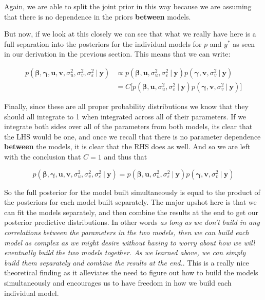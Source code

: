 \documentclass[12pt,twoside]{reedthesis}
\begin{document}
Again, we are able to split the joint prior in this way because we are assuming that there is no dependence in the priors \textbf{between} models.

But now, if we look at this closely we can see that what we really have here is a full separation into the posteriors for the individual models for \(p\) and \(y^*\) as seen in our derivation in the previous section. This means that we can write:

\[
\begin{aligned}
p(\boldsymbol{\beta}, \boldsymbol{\gamma}, \mathbf{u}, \mathbf{v}, \sigma_u^2, \sigma_v^2, \sigma_{\varepsilon}^2\ | \ \mathbf{y})  &\propto p(\boldsymbol{\beta}, \mathbf{u}, \sigma_u^2, \sigma_{\varepsilon}^2 \ | \ \mathbf{y})p(\boldsymbol{\gamma}, \mathbf{v}, \sigma_v^2 \ | \ \mathbf{y}) \\
  &= C\bigg[p(\boldsymbol{\beta}, \mathbf{u}, \sigma_u^2, \sigma_{\varepsilon}^2 \ | \ \mathbf{y})p(\boldsymbol{\gamma}, \mathbf{v}, \sigma_v^2 \ | \ \mathbf{y})\bigg]
\end{aligned}
\]

Finally, since these are all proper probability distributions we know that they should all integrate to 1 when integrated across all of their parameters. If we integrate both sides over all of the parameters from both models, its clear that the LHS would be one, and once we recall that there is no parameter dependence \textbf{between} the models, it is clear that the RHS does as well. And so we are left with the conclusion that \(C = 1\) and thus that

\[
p(\boldsymbol{\beta}, \boldsymbol{\gamma}, \mathbf{u}, \mathbf{v}, \sigma_u^2, \sigma_v^2, \sigma_{\varepsilon}^2\ | \ \mathbf{y})  = p(\boldsymbol{\beta}, \mathbf{u}, \sigma_u^2, \sigma_{\varepsilon}^2 \ | \ \mathbf{y})p(\boldsymbol{\gamma}, \mathbf{v}, \sigma_v^2 \ | \ \mathbf{y}) 
\]

So the full posterior for the model built simultaneously is equal to the product of the posteriors for each model built separately. The major upshot here is that we can fit the models separately, and then combine the results at the end to get our posterior predictive distributions. In other words \emph{as long as we don't build in any correlations between the parameters in the two models, then we can build each model as complex as we might desire without having to worry about how we will eventually build the two models together. As we learned above, we can simply build them separately and combine the results at the end.}. This is a really nice theoretical finding as it alleviates the need to figure out how to build the models simultaneously and encourages us to have freedom in how we build each individual model.
\end{document}
